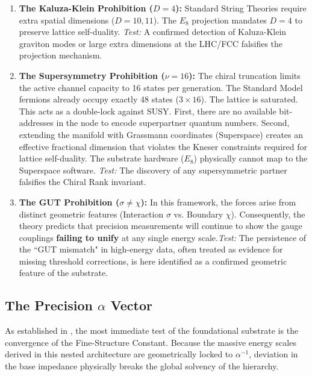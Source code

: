 \begin{enumerate}
    \item \textbf{The Kaluza-Klein Prohibition ($D=4$):} Standard String Theories require extra spatial dimensions ($D=10, 11$). The $E_8$ projection mandates $D=4$ to preserve lattice self-duality. 
    \textit{Test:} A confirmed detection of Kaluza-Klein graviton modes or large extra dimensions at the LHC/FCC falsifies the projection mechanism.
    
    \item \textbf{The Supersymmetry Prohibition ($\nu=16$):} 
    The chiral truncation limits the active channel capacity to 16 states per generation. The Standard Model fermions already occupy exactly 48 states ($3 \times 16$). The lattice is saturated. This acts as a double-lock against SUSY. First, there are no available bit-addresses in the node to encode superpartner quantum numbers. Second, extending the manifold with Grassmann coordinates (Superspace) creates an effective fractional dimension that violates the Kneser constraints required for lattice self-duality. The substrate hardware ($E_8$) physically cannot map to the Superspace software. \textit{Test:} The discovery of any supersymmetric partner falsifies the Chiral Rank invariant.

    \item \textbf{The GUT Prohibition ($\sigma \neq \chi$):} In this framework, the forces arise from distinct geometric features (Interaction $\sigma$ vs. Boundary $\chi$). Consequently, the theory predicts that precision measurements will continue to show the gauge couplings \textbf{failing to unify} at any single energy scale.\textit{Test:} The persistence of the ``GUT mismatch" in high-energy data, often treated as evidence for missing threshold corrections, is here identified as a confirmed geometric feature of the substrate.
\end{enumerate}

\subsection{The Precision \texorpdfstring{$\alpha$}{alpha} Vector}
As established in \cite{meyer_informational_2026}, the most immediate test of the foundational substrate is the convergence of the Fine-Structure Constant. Because the massive energy scales derived in this nested architecture are geometrically locked to $\alpha^{-1}$, deviation in the base impedance physically breaks the global solvency of the hierarchy.

